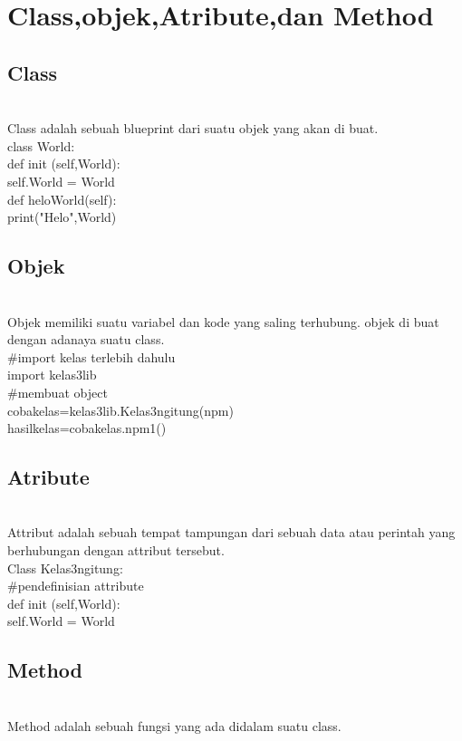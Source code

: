 			
    \section{Class,objek,Atribute,dan Method}
    \subsection*{Class}\\
			Class adalah sebuah blueprint dari suatu objek yang akan di buat.\\
			
class World:\\
    def init (self,World):\\
        self.World = World\\
    def heloWorld(self):\\
        print("Helo",World)\\
			
			
	\subsection*{Objek}\\
	Objek memiliki suatu variabel dan kode yang saling terhubung. objek di buat dengan adanaya suatu class.\\
			
#import kelas terlebih dahulu\\
import kelas3lib\\
#membuat object\\
cobakelas=kelas3lib.Kelas3ngitung(npm)\\ 
hasilkelas=cobakelas.npm1()\\
			
			
	\subsection*{Atribute}\\
			Attribut adalah sebuah tempat tampungan dari sebuah data atau perintah yang berhubungan dengan attribut tersebut.\\
			
Class Kelas3ngitung:\\
	#pendefinisian attribute\\
    def init (self,World):\\
        self.World = World\\
			
			
	\subsection*{Method}\\
			Method adalah sebuah fungsi yang ada didalam suatu class.\\
			
